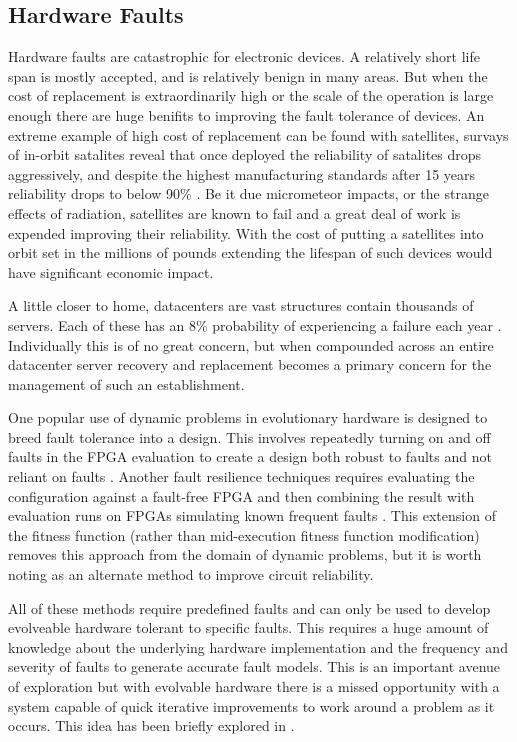 \subsection{Hardware Faults}
Hardware faults are catastrophic for electronic devices. A relatively short life span is
mostly accepted, and is relatively benign in many areas. But when the cost of replacement is
extraordinarily high or the scale of the operation is large enough there are huge benifits
to improving the fault tolerance of devices. An extreme example of high cost of replacement
can be found with satellites, survays of in-orbit satalites reveal that once deployed the
reliability of satalites drops aggressively, and despite the highest manufacturing standards
after 15 years reliability drops to below
90\% \cite{CASTET20091718}. Be it due micrometeor impacts,
or the strange effects of radiation, satellites are known to fail and a great deal of
work is expended improving their reliability. With the cost
of putting a satellites into orbit set in the millions of pounds extending the lifespan
of such devices would have significant economic impact.

A little closer to home, datacenters are vast structures contain thousands of servers.
Each of these has an 8\% probability of experiencing a failure each year
 \cite{Vishwanath:2010:CCC:1807128.1807161}.
Individually this is of no great concern, but when compounded across an entire datacenter
server recovery and replacement becomes a primary concern for the management of
such an establishment.

One popular use of dynamic problems in evolutionary hardware is designed to breed
fault tolerance into a
design. This involves repeatedly turning on and off faults in the FPGA evaluation to
create a design both robust to faults and not reliant on faults \cite{651463}. Another fault resilience
techniques requires evaluating the configuration
against a fault-free FPGA and then combining the result with evaluation runs on FPGAs
simulating known frequent faults \cite{Keymeulen2000}. This extension of the fitness function (rather than
mid-execution fitness function modification) removes this approach from the domain of dynamic problems,
but it is worth noting as an alternate method to improve circuit reliability.

All of these methods require predefined faults and can only be used to
develop evolveable hardware tolerant to specific faults. This requires a huge amount of knowledge
about the underlying hardware implementation and the frequency and severity of faults to generate
accurate fault models. This
is an important avenue of exploration but with evolvable hardware there is a missed
opportunity with a system capable of quick iterative improvements to work around
a problem as it occurs. This idea has been briefly explored in \cite{10.1007/3-540-61093-6_6}.

